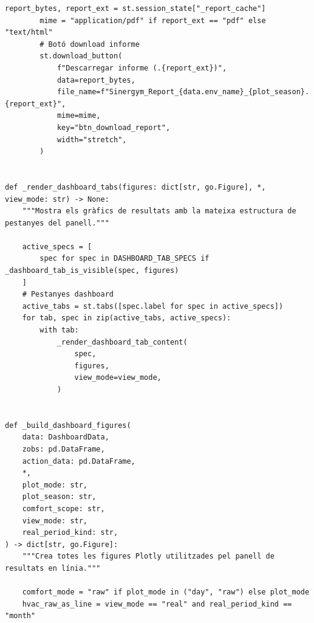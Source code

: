 \documentclass[10pt,a4paper]{article}
\begin{document}
\begin{lstlisting}[style=studioPython,caption={page\_components/resultats\_dashboard.py},label={lst:page-components-resultats-dashboard-py}]
        report_bytes, report_ext = st.session_state["_report_cache"]
        mime = "application/pdf" if report_ext == "pdf" else "text/html"
        # Botó download informe
        st.download_button(
            f"Descarregar informe (.{report_ext})",
            data=report_bytes,
            file_name=f"Sinergym_Report_{data.env_name}_{plot_season}.{report_ext}",
            mime=mime,
            key="btn_download_report",
            width="stretch",
        )


def _render_dashboard_tabs(figures: dict[str, go.Figure], *, view_mode: str) -> None:
    """Mostra els gràfics de resultats amb la mateixa estructura de pestanyes del panell."""

    active_specs = [
        spec for spec in DASHBOARD_TAB_SPECS if _dashboard_tab_is_visible(spec, figures)
    ]
    # Pestanyes dashboard
    active_tabs = st.tabs([spec.label for spec in active_specs])
    for tab, spec in zip(active_tabs, active_specs):
        with tab:
            _render_dashboard_tab_content(
                spec,
                figures,
                view_mode=view_mode,
            )


def _build_dashboard_figures(
    data: DashboardData,
    zobs: pd.DataFrame,
    action_data: pd.DataFrame,
    *,
    plot_mode: str,
    plot_season: str,
    comfort_scope: str,
    view_mode: str,
    real_period_kind: str,
) -> dict[str, go.Figure]:
    """Crea totes les figures Plotly utilitzades pel panell de resultats en línia."""

    comfort_mode = "raw" if plot_mode in ("day", "raw") else plot_mode
    hvac_raw_as_line = view_mode == "real" and real_period_kind == "month"


\end{lstlisting}
\end{document}
